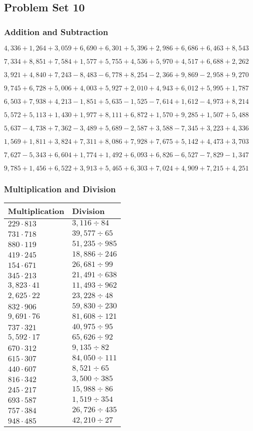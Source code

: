 \hypertarget{problem-set-10-3}{%
\subsection{Problem Set 10}\label{problem-set-10-3}}

\hypertarget{addition-and-subtraction-172}{%
\subsubsection{Addition and
Subtraction}\label{addition-and-subtraction-172}}

\(4,336+1,264+3,059+6,690+6,301+5,396+2,986+6,686+6,463+ 8,543\)

\(7,334+8,851+7,584+1,577+5,755+4,536+5,970+4,517+6,688+2,262\)

\(3,921+4,840+7,243-8,483-6,778+8,254-2,366+9,869-2,958+9,270\)

\(9,745+6,728+5,006+4,003+5,927+2,010+4,943+6,012+5,995+1,787\)

\(6,503+7,938+4,213-1,851+5,635-1,525-7,614+1,612-4,973+8,214\)

\(5,572+5,113+1,430+1,977+8,111+6,872+1,570+9,285+1,507+5,488\)

\(5,637-4,738+7,362-3,489+5,689-2,587+3,588-7,345+3,223+4,336\)

\(1,569+1,811+3,824+7,311+8,086+7,928+7,675+5,142+4,473+3,703\)

\(7,627-5,343+6,604+1,774+1,492+6,093+6,826-6,527-7,829-1,347\)

\(9,785+1,456+6,522+3,913+5,465+6,303+7,024+4,909+7,215+4,251\)

\hypertarget{multiplication-and-division-171}{%
\subsubsection{Multiplication and
Division}\label{multiplication-and-division-171}}

\begin{longtable}[]{@{}ll@{}}
\toprule
Multiplication & Division\tabularnewline
\midrule
\endhead
\(229\cdot813\) & \(3,116÷84\)\tabularnewline
\(731\cdot718\) & \(39,577÷65\)\tabularnewline
\(880\cdot119\) & \(51,235÷985\)\tabularnewline
\(419\cdot245\) & \(18,886÷246\)\tabularnewline
\(154\cdot671\) & \(26,681÷99\)\tabularnewline
\(345\cdot213\) & \(21,491÷638\)\tabularnewline
\(3,823\cdot41\) & \(11,493÷962\)\tabularnewline
\(2,625\cdot22\) & \(23,228÷48\)\tabularnewline
\(832\cdot906\) & \(59,830÷230\)\tabularnewline
\(9,691\cdot76\) & \(81,608÷121\)\tabularnewline
\(737\cdot321\) & \(40,975÷95\)\tabularnewline
\(5,592\cdot17\) & \(65,626÷92\)\tabularnewline
\(670\cdot312\) & \(9,135÷82\)\tabularnewline
\(615\cdot307\) & \(84,050÷111\)\tabularnewline
\(440\cdot607\) & \(8,521÷65\)\tabularnewline
\(816\cdot342\) & \(3,500÷385\)\tabularnewline
\(245\cdot217\) & \(15,988÷86\)\tabularnewline
\(693\cdot587\) & \(1,519÷354\)\tabularnewline
\(757\cdot384\) & \(26,726÷435\)\tabularnewline
\(948\cdot485\) & \(42,210÷27\)\tabularnewline
\bottomrule
\end{longtable}

